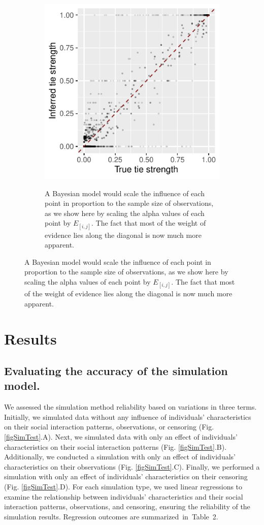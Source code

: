 \documentclass[Afour,sageh,times]{sagej}
\begin{document}
\begin{figure}[h]
  \begin{subfigure}[b]{0.4\textwidth}
         \centering
         \caption{A Bayesian model would scale the influence of each point in proportion to the sample size of observations, as we show here by scaling the alpha values of each point by $E_{[i,j]}$. The fact that most of the weight of evidence lies along the diagonal is now much more apparent.}
         \includegraphics[trim={0 0cm 0 0},clip,width=\textwidth]{Figures/ScatterFrameB.pdf}
         \label{srmx3b_drs}
     \end{subfigure}
\end{figure}

\section{Results}
\subsection{Evaluating the accuracy of the simulation model.}
We assessed the simulation method reliability based on variations in three terms. Initially, we simulated data without any influence of individuals' characteristics on their social interaction patterns, observations, or censoring (Fig. \ref{figSimTest}.A). Next, we simulated data with only an effect of individuals' characteristics on their social interaction patterns (Fig. \ref{figSimTest}.B). Additionally, we conducted a simulation with only an effect of individuals' characteristics on their observations (Fig. \ref{figSimTest}.C). Finally, we performed a simulation with only an effect of individuals' characteristics on their censoring (Fig. \ref{figSimTest}.D). For each simulation type, we used linear regressions to examine the relationship between individuals' characteristics and their social interaction patterns, observations, and censoring, ensuring the reliability of the simulation results. Regression outcomes are summarized in Table 2.
\end{document}
